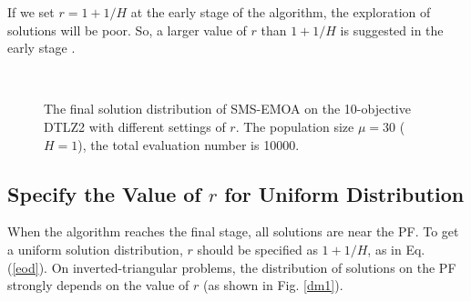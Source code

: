 \documentclass[conference]{IEEEtran}
\begin{document}
If we set $r = 1+1/H$ at the early stage of the algorithm, the exploration of solutions will be poor. 
So, a larger value of $r$ than $1+1/H$ is suggested in the early stage \cite{hisao:dynamic}. 
\begin{figure}[!t]
  \centering
  \quad
  \\
  \caption{
    The final solution distribution of SMS-EMOA on the 10-objective DTLZ2 with different settings of $r$. 
    The population size $\mu = 30$ ($H=1$), the total evaluation number is 10000.
  }
  \label{nud}
\end{figure} 

\subsection{Specify the Value of $r$ for Uniform Distribution}
When the algorithm reaches the final stage, all solutions are near the PF. 
To get a uniform solution distribution, $r$ should be specified as $1+1/H$, as in Eq. (\ref{eod}). 
On inverted-triangular problems, the distribution of solutions on the PF
strongly depends on the value of $r$ (as shown in Fig. \ref{dm1}). 
\end{document}
